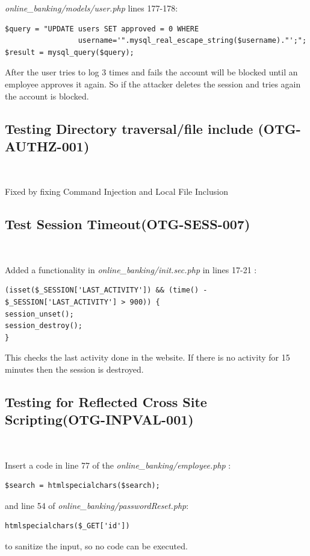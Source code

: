 \documentclass[headsepline,footsepline,footinclude=false,oneside,fontsize=11pt,paper=a4,listof=totoc,bibliography=totoc]{scrbook} %
\begin{document}
\textit{online\_banking/models/user.php} lines 177-178:\\

\begin{lstlisting} 
$query = "UPDATE users SET approved = 0 WHERE 
                 username='".mysql_real_escape_string($username)."';"; 
$result = mysql_query($query);
\end{lstlisting} 
After the user tries to log 3 times and fails the account will be blocked until an employee approves it again. So if the attacker deletes the session and tries again the account is blocked.\\


\subsection{Testing Directory traversal/file include (OTG-AUTHZ-001)}\

Fixed by fixing Command Injection and Local File Inclusion

\pagebreak
\subsection{Test Session Timeout(OTG-SESS-007)}\

Added a functionality in \textit{online\_banking/init.sec.php} in lines 17-21 :  


\begin{lstlisting}
(isset($_SESSION['LAST_ACTIVITY']) && (time() - $_SESSION['LAST_ACTIVITY'] > 900)) { 
session_unset();    
session_destroy();   
}
\end{lstlisting} 


This checks the last activity done in the website. If there is no activity for 15 minutes then the session is destroyed.\\



\subsection{Testing for Reflected Cross Site Scripting(OTG-INPVAL-001)} \

Insert a code in line 77 of the\textit{ online\_banking/employee.php} : 
\begin{lstlisting}
$search = htmlspecialchars($search);  

\end{lstlisting}
and line 54 of \textit{online\_banking/passwordReset.php}:  
\begin{lstlisting} 
htmlspecialchars($_GET['id']) 
\end{lstlisting}
to sanitize the input, so no code can be executed.
\pagebreak
\end{document}
